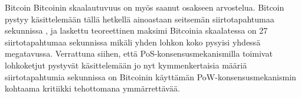 \begin{subsection}{Bitcoin\label{bitcoin}}
Bitcoinin skaalautuvuus on myös saanut osakseen arvostelua. Bitcoin pystyy käsittelemään tällä hetkellä ainoastaan seitsemän siirtotapahtumaa sekunnissa \cite{bitcoin-tps}, ja laskettu teoreettinen maksimi Bitcoinia skaalatessa on 27 siirtotapahtumaa sekunnissa mikäli yhden lohkon koko pysyisi yhdessä megatavussa. Verrattuna siihen, että PoS-konsensusmekanismilla toimivat lohkoketjut pystyvät käsittelemään jo nyt kymmenkertaisia määriä siirtotapahtumia sekunnissa \cite{algorandtech, cardano-ouroboros} on Bitcoinin käyttämän PoW-konsensusmekanismin kohtaama kritiikki tehottomana ymmärrettävää.

\end{subsection}